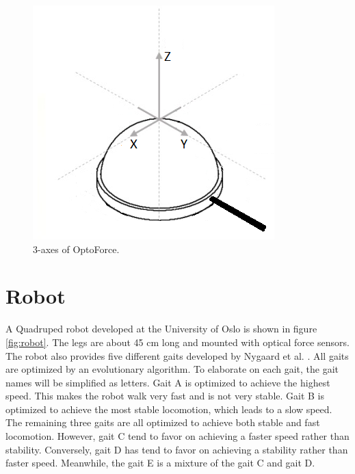 \documentclass[USenglish]{ifimaster}  %
\begin{document}
\begin{figure}[h]
	\centering
	\includegraphics[scale=0.8]{Figures/OptoforceAxis32}
	\caption[Force directions of the OptoForce sensor]{3-axes of OptoForce.}
	\label{fig:OptoforceAxis}
\end{figure}

\section{Robot} \label{sec:robot}
A Quadruped robot developed at the University of Oslo is shown in figure \ref{fig:robot}. The legs are about 45 cm long and mounted with optical force sensors. The robot also provides five different gaits developed by Nygaard et al. \cite{7850167}.  All gaits are optimized by an evolutionary algorithm. To elaborate on each gait, the gait names will be simplified as letters. Gait A is optimized to achieve the highest speed. This makes the robot walk very fast and is not very stable. Gait B is optimized to achieve the most stable locomotion, which leads to a slow speed. The remaining three gaits are all optimized to achieve both stable and fast locomotion. However, gait C tend to favor on achieving a faster speed rather than stability. Conversely, gait D has tend to favor on achieving a stability rather than faster speed. Meanwhile, the gait E is a mixture of the gait C and gait D.
\end{document}
